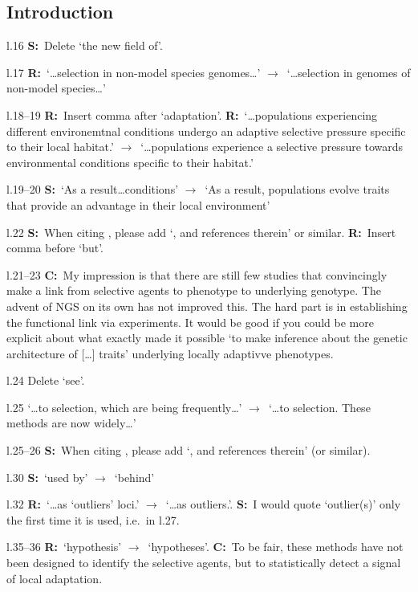 \documentclass[11pt]{article}
\newenvironment{my_description}
{\begin{description}
  \setlength{\itemsep}{2pt}
  \setlength{\parskip}{0pt}
  \setlength{\parsep}{0pt}}
{\end{description}}
\newcommand{\ra}{$\rightarrow$\ }
\newcommand{\C}{\textbf{C:}\ }
\newcommand{\R}{\textbf{R:}\ }
\newcommand{\V}{\textbf{S:}\ }
\begin{document}
\subsection{Introduction}
\begin{my_description}
	
	\item[l.16] \V Delete `the new field of'.
	\item[l.17] \R `\dots selection in non-model species genomes\dots' \ra `\dots selection in genomes of non-model species\dots'
	\item[l.18--19] \R Insert comma after `adaptation'. \R `\dots populations experiencing different environemtnal conditions undergo an adaptive selective pressure specific to their local habitat.' \ra `\dots populations experience a selective pressure towards environmental conditions specific to their habitat.'
	\item[l.19--20] \V `As a result\dots conditions' \ra `As a result, populations evolve traits that provide an advantage in their local environment'
	\item[l.22] \V When citing \cite{Blanquart:2013uq}, please add `, and references therein' or similar. \R Insert comma before `but'.
	\item [l.21--23] \C My impression is that there are still few studies that convincingly make a link from selective agents to phenotype to underlying genotype. The advent of NGS on its own has not improved this. The hard part is in establishing the functional link via experiments. It would be good if you could be more explicit about what exactly made it possible `to make inference about the genetic architecture of [\dots] traits' underlying locally adaptivve phenotypes.
	\item[l.24] Delete `see'.
	\item[l.25] `\dots to selection, which are being frequently\dots' \ra `\dots to selection. These methods are now widely\dots'
	\item[l.25--26] \V When citing \cite{Faria:2014fk}, please add `, and references therein' (or similar).
	\item[l.30] \V `used by' \ra `behind'
	\item[l.32] \R `\dots as `outliers' loci.' \ra `\dots as outliers.'. \V I would quote `outlier(s)' only the first time it is used, i.e.\ in l.27.
	\item[l.35--36] \R `hypothesis' \ra `hypotheses'. \C To be fair, these methods have not been designed to identify the selective agents, but to statistically detect a signal of local adaptation.

\end{my_description}
\end{document}
